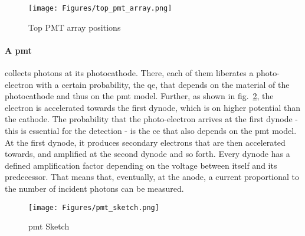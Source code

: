 \begin{figure}
    \centering
    \texttt{[image: Figures/top\_pmt\_array.png]}  %
    \caption[Top PMT array positions]{
    Top PMT array positions
    }
    \label{fig:top-pmt-array}
\end{figure}

\paragraph{A \gls{pmt}} collects photons at its photocathode.
There, each of them liberates a photo-electron with a certain probability, the \gls{qe}, that depends on the material of the photocathode and thus on the \gls{pmt} model.
Further, as shown in fig.~\ref{fig:pmt_sketch}, the electron is accelerated towards the first dynode, which is on higher potential than the cathode.
The probability that the photo-electron arrives at the first dynode - this is essential for the detection - is the \gls{ce} that also depends on the \gls{pmt} model.
At the first dynode, it produces secondary electrons that are then accelerated towards, and amplified at the second dynode and so forth.
Every dynode has a defined amplification factor depending on the voltage between itself and its predecessor.
That means that, eventually, at the anode, a current proportional to the number of incident photons can be measured.



\begin{figure}
\centering
\texttt{[image: Figures/pmt\_sketch.png]}  %
\caption[\gls{pmt} Sketch]{
    \gls{pmt} Sketch
    }
\label{fig:pmt_sketch}
\end{figure}


